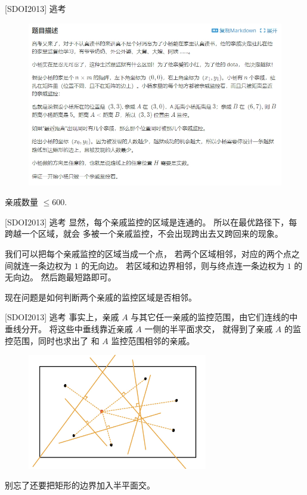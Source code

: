 \documentclass{beamer}
\begin{document}
\begin{frame}{[SDOI2013] 逃考}
    \footnotesize
    \begin{figure}[H]
        \centering
        \includegraphics[width=\textwidth]{pic/sdoi2013_prb.png}
    \end{figure}
    \vspace{-1em}
    亲戚数量 $\leq 600$.
\end{frame}

\begin{frame}{[SDOI2013] 逃考}
    \footnotesize
    显然，每个亲戚监控的区域是连通的。
    所以在最优路径下，每跨越一个区域，就会
    多被一个亲戚监控，不会出现跨出去又跨回来的现象。

    \vspace{1em}\pause
    我们可以把每个亲戚监控的区域当成一个点，
    若两个区域相邻，对应的两个点之间就连一条边权为 $1$ 的无向边。
    若区域和边界相邻，则与终点连一条边权为 $1$ 的无向边。
    然后跑最短路即可。

    \vspace{1em}
    现在问题是如何判断两个亲戚的监控区域是否相邻。
\end{frame}

\begin{frame}{[SDOI2013] 逃考}
    \footnotesize
    事实上，亲戚 $A$ 与其它任一亲戚的监控范围，由它们连线的中垂线分开。
    将这些中垂线靠近亲戚 $A$ 一侧的半平面求交，
    就得到了亲戚 $A$ 的监控范围，同时也求出了
    和 $A$ 监控范围相邻的亲戚。

    \begin{figure}[H]
        \centering
        \includegraphics[width=0.7\textwidth]{pic/sdoi2013_sol.jpg}
    \end{figure}

    别忘了还要把矩形的边界加入半平面交。
\end{frame}
\end{document}
